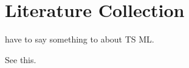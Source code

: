 \section{Literature Collection} %

\textcite[4-5]{Bont2012} have to say something to about TS ML. %

See this. \parencite{Bont2012}




